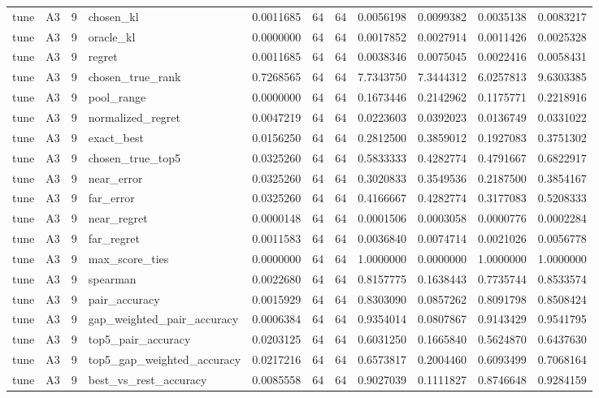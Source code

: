 \begin{tabular}{llrlrrrrrrr}
tune & A3 & 9 & chosen_kl & 0.0011685 & 64 & 64 & 0.0056198 & 0.0099382 & 0.0035138 & 0.0083217 \\
tune & A3 & 9 & oracle_kl & 0.0000000 & 64 & 64 & 0.0017852 & 0.0027914 & 0.0011426 & 0.0025328 \\
tune & A3 & 9 & regret & 0.0011685 & 64 & 64 & 0.0038346 & 0.0075045 & 0.0022416 & 0.0058431 \\
tune & A3 & 9 & chosen_true_rank & 0.7268565 & 64 & 64 & 7.7343750 & 7.3444312 & 6.0257813 & 9.6303385 \\
tune & A3 & 9 & pool_range & 0.0000000 & 64 & 64 & 0.1673446 & 0.2142962 & 0.1175771 & 0.2218916 \\
tune & A3 & 9 & normalized_regret & 0.0047219 & 64 & 64 & 0.0223603 & 0.0392023 & 0.0136749 & 0.0331022 \\
tune & A3 & 9 & exact_best & 0.0156250 & 64 & 64 & 0.2812500 & 0.3859012 & 0.1927083 & 0.3751302 \\
tune & A3 & 9 & chosen_true_top5 & 0.0325260 & 64 & 64 & 0.5833333 & 0.4282774 & 0.4791667 & 0.6822917 \\
tune & A3 & 9 & near_error & 0.0325260 & 64 & 64 & 0.3020833 & 0.3549536 & 0.2187500 & 0.3854167 \\
tune & A3 & 9 & far_error & 0.0325260 & 64 & 64 & 0.4166667 & 0.4282774 & 0.3177083 & 0.5208333 \\
tune & A3 & 9 & near_regret & 0.0000148 & 64 & 64 & 0.0001506 & 0.0003058 & 0.0000776 & 0.0002284 \\
tune & A3 & 9 & far_regret & 0.0011583 & 64 & 64 & 0.0036840 & 0.0074714 & 0.0021026 & 0.0056778 \\
tune & A3 & 9 & max_score_ties & 0.0000000 & 64 & 64 & 1.0000000 & 0.0000000 & 1.0000000 & 1.0000000 \\
tune & A3 & 9 & spearman & 0.0022680 & 64 & 64 & 0.8157775 & 0.1638443 & 0.7735744 & 0.8533574 \\
tune & A3 & 9 & pair_accuracy & 0.0015929 & 64 & 64 & 0.8303090 & 0.0857262 & 0.8091798 & 0.8508424 \\
tune & A3 & 9 & gap_weighted_pair_accuracy & 0.0006384 & 64 & 64 & 0.9354014 & 0.0807867 & 0.9143429 & 0.9541795 \\
tune & A3 & 9 & top5_pair_accuracy & 0.0203125 & 64 & 64 & 0.6031250 & 0.1665840 & 0.5624870 & 0.6437630 \\
tune & A3 & 9 & top5_gap_weighted_accuracy & 0.0217216 & 64 & 64 & 0.6573817 & 0.2004460 & 0.6093499 & 0.7068164 \\
tune & A3 & 9 & best_vs_rest_accuracy & 0.0085558 & 64 & 64 & 0.9027039 & 0.1111827 & 0.8746648 & 0.9284159 \\

\end{tabular}
